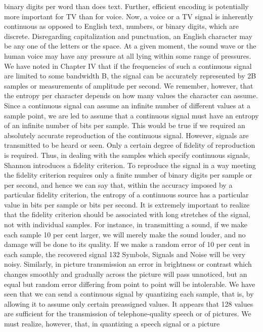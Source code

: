 {{{binary digits per word than does text. Further, efficient encoding
is potentially more important for TV than for voice.
Now, a voice or a TV signal is inherently continuous as opposed
to English text, numbers, or binary digits, which are discrete.
Disregarding capitalization and punctuation, an English character
may be any one of the letters or the space. At a given moment, the
sound wave or the human voice may have any pressure at all lying
within some range of pressures. We have noted in Chapter IV that
if the frequencies of such a continuous signal are limited to some
bandwidth B, the signal can be accurately represented by 2B
samples or measurements of amplitude per second.
We remember, however, that the entropy per character depends
on how many values the character can assume. Since a continuous
signal can assume an infinite number of different values at a sample
point, we are led to assume that a continuous signal must have an
entropy of an infinite number of bits per sample.
This would be true if we required an absolutely accurate reproduction
of the continuous signal. However, signals are transmitted
to be heard or seen. Only a certain degree of fidelity of reproduction
is required. Thus, in dealing with the samples which specify
continuous signals, Shannon introduces a fidelity criterion. To
reproduce the signal in a way meeting the fidelity criterion requires
only a finite number of binary digits per sample or per second, and
hence we can say that, within the accuracy imposed by a particular
fidelity criterion, the entropy of a continuous source has a particular
value in bits per sample or bits per second.
It is extremely important to realize that the fidelity criterion
should be associated with long stretches of the signal, not with
individual samples. For instance, in transmitting a sound, if we
make each sample 10 per cent larger, we will merely make the
sound louder, and no damage will be done to its quality. If we make
a random error of 10 per cent in each sample, the recovered signal
132
Symbols, Signals and Noise
will be very noisy. Similarly, in picture transmission an error in
brightness or contrast which changes smoothly and gradually
across the picture will pass unnoticed, but an equal but random
error differing from point to point will be intolerable.
We have seen that we can send a continuous signal by quantizing
each sample, that is, by allowing it to assume only certain preassigned
values. It appears that 128 values are sufficient for the
transmission of telephone-quality speech or of pictures. We must
realize, however, that, in quantizing a speech signal or a picture
}}}
